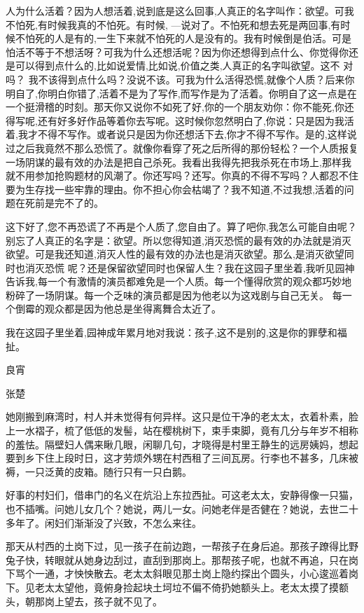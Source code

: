 \documentclass{ctexart}
\newcommand{\blkx}{\vspace*{4\baselineskip} }
\renewcommand{\\}{\par}
\begin{document}
\\人为什么活着？因为人想活着,说到底是这么回事,人真正的名字叫作：欲望。可我不怕死,有时候我真的不怕死。有时候, ---说对了。不怕死和想去死是两回事,有时候不怕死的人是有的,一生下来就不怕死的人是没有的。我有时候倒是伯活。可是怕活不等于不想活呀？可我为什么还想活呢？因为你还想得到点什么、你觉得你还是可以得到点什么的,比如说爱情,比如说,价值之类,人真正的名字叫欲望。这不 对吗？ 我不该得到点什么吗？没说不该。可我为什么活得恐慌,就像个人质？后来你明自了,你明白你错了,活着不是为了写作,而写作是为了活着。你明自了这一点是在一个挺滑稽的时刻。那天你又说你不如死了好,你的一个朋友劝你：你不能死,你还得写呢,还有好多好作品等着你去写呢。这时候你忽然明白了,你说：只是因为我活着,我才不得不写作。或者说只是因为你还想活下去,你才不得不写作。是的,这样说过之后我竟然不那么恐慌了。就像你看穿了死之后所得的那份轻松？一个人质报复一场阴谋的最有效的办法是把自己杀死。我看出我得先把我杀死在市场上,那样我就不用参加抢购题材的风潮了。你还写吗？还写。你真的不得不写吗？人都忍不住要为生存找一些牢靠的理由。你不担心你会枯竭了？我不知道,不过我想,活着的问题在死前是完不了的。
\\这下好了,您不再恐谎了不再是个人质了,您自由了。算了吧你,我怎么可能自由呢？别忘了人真正的名字是：欲望。所以您得知道,消灭恐慌的最有效的办法就是消灭欲望。可是我还知道,消灭人性的最有效的办法也是消灭欲望。那么,是消灭欲望同时也消灭恐慌 呢？还是保留欲望同时也保留人生？我在这园子里坐着,我听见园神告诉我,每一个有激情的演员都难免是一个人质。每一个懂得欣赏的观众都巧妙地粉碎了一场阴谋。每一个乏味的演员都是因为他老以为这戏剧与自己无关。 每一个倒霉的观众都是因为他总是坐得离舞合太近了。
\\我在这园子里坐着,园神成年累月地对我说：孩子,这不是别的,这是你的罪孽和福扯。
\blkx
\\\centerline{良宵}\\  \centerline{张楚}\\
她刚搬到麻湾时，村人并未觉得有何异样。这只是位干净的老太太，衣着朴素，脸上一水褶子，梳了低低的发髻，站在樱桃树下，束手束脚，竟有几分与年岁不相称的羞怯。隔壁妇人偶来瞅几眼，闲聊几句，才晓得是村里王静生的远房姨妈，想起要到乡下住上段时日，这才劳烦外甥在村西租了三间瓦房。行李也不甚多，几床被褥，一只泛黄的皮箱。随行只有一只白鹅。
\\好事的村妇们，借串门的名义在炕沿上东拉西扯。可这老太太，安静得像一只猫，也不插嘴。问她儿女几个？她说，两儿一女。问她老伴是否健在？她说，去世二十多年了。闲妇们渐渐没了兴致，不怎么来往。
\\那天从村西的土岗下过，见一孩子在前边跑，一帮孩子在身后追。那孩子蹽得比野兔子快，转眼就从她身边刮过，直刮到那岗上。那帮孩子呢，也就不再追，只在岗下骂个一通，才怏怏散去。老太太斜眼见那土岗上隐约探出个圆头，小心逡巡着岗下。见老太太望他，竟俯身捡起块土坷垃不偏不倚扔她额头上。老太太摸了摸额头，朝那岗上望去，孩子就不见了。
\end{document}

